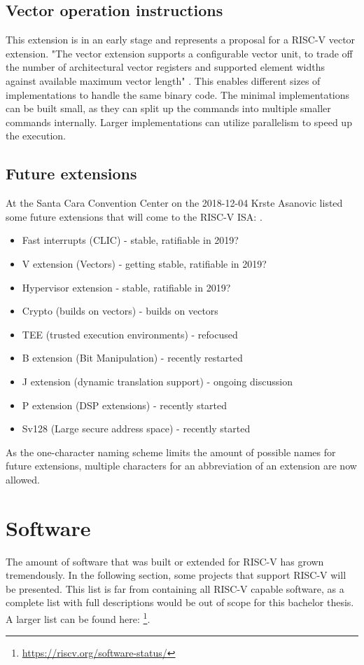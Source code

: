 \subsection{Vector operation instructions}
This extension is in an early stage and represents
a proposal for a RISC-V vector extension.
"The vector extension supports a configurable vector 
unit, to trade off the number of architectural vector
registers and supported element widths against
available maximum vector length"
\cite[p.~93]{risc-v_isa_manual_user_level}.
This enables different sizes of implementations
to handle the same binary code.
The minimal implementations can be built small,
as they can split up the commands into multiple
smaller commands internally. Larger implementations
can utilize parallelism to speed up the execution.

\subsection{Future extensions}
At the Santa Cara Convention Center on the 2018-12-04
Krste Asanovic listed some future extensions that
will come to the RISC-V ISA:
\cite[p.~14]{risc-v_state_of_the_union_dec_2018}.
\begin{itemize}
    \item Fast interrupts (CLIC) - stable, ratifiable in 2019?
    \item V extension (Vectors) - getting stable, ratifiable in 2019?
    \item Hypervisor extension - stable, ratifiable in 2019?
    \item Crypto (builds on vectors) - builds on vectors
    \item TEE (trusted execution environments) - refocused
    \item B extension (Bit Manipulation) - recently restarted
    \item J extension (dynamic translation support) - ongoing discussion
    \item P extension (DSP extensions) - recently started
    \item Sv128 (Large secure address space) - recently started
\end{itemize}
As the one-character naming scheme limits the amount of
possible names for future extensions, multiple
characters for an abbreviation of an extension
are now allowed.

\section{Software} \label{chap:risc-v,sect:software}
The amount of software that was built or extended
for RISC-V has grown tremendously.
In the following section, some projects that support
RISC-V will be presented. This list is far from
containing all RISC-V capable software, as
a complete list with full descriptions would be
out of scope for this bachelor thesis.
A larger list can be found here:
\footnote{\url{https://riscv.org/software-status/}}.

